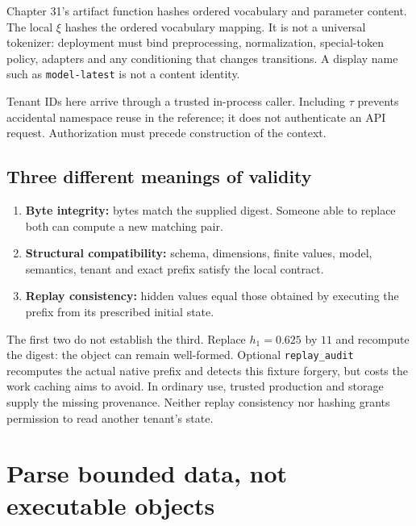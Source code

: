 
Chapter 31's artifact function hashes ordered vocabulary and parameter
content. The local $\xi$ hashes the ordered vocabulary mapping.
It is not a universal tokenizer: deployment must bind preprocessing,
normalization, special-token policy, adapters and any conditioning that
changes transitions. A display name such as \texttt{model-latest} is not
a content identity.

Tenant IDs here arrive through a trusted in-process caller. Including $\tau$
prevents accidental namespace reuse in the reference; it does not authenticate
an API request. Authorization must precede construction of the context.

\subsection{Three different meanings of validity}

\begin{enumerate}
\item \textbf{Byte integrity:} bytes match the supplied digest.
   Someone able to replace both can compute a new matching pair.
\item \textbf{Structural compatibility:} schema, dimensions, finite values,
   model, semantics, tenant and exact prefix satisfy the local contract.
\item \textbf{Replay consistency:} hidden values equal those obtained by
   executing the prefix from its prescribed initial state.
\end{enumerate}
The first two do not establish the third. Replace $h_1=0.625$ by $11$ and
recompute the digest: the object can remain well-formed. Optional
\texttt{replay\_audit} recomputes the actual native prefix and detects this
fixture forgery, but costs the work caching aims to avoid. In ordinary use,
trusted production and storage supply the missing provenance. Neither replay
consistency nor hashing grants permission to read another tenant's state.

\section{Parse bounded data, not executable objects}

